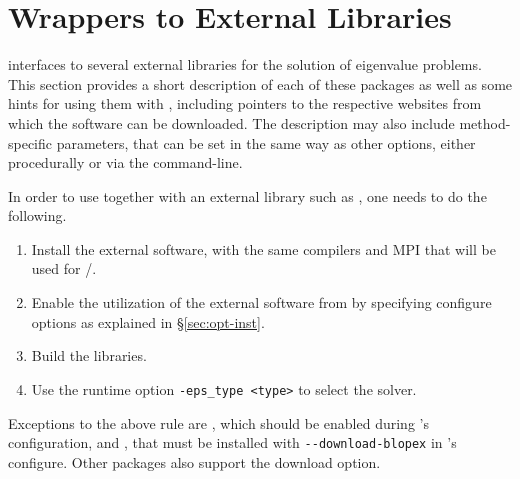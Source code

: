 \section{Wrappers to External Libraries}
\label{sec:wrap}

	\slepc interfaces to several external libraries for the solution of eigenvalue problems. This section provides a short description of each of these packages as well as some hints for using them with \slepc, including pointers to the respective websites from which the software can be downloaded. The description may also include method-specific parameters, that can be set in the same way as other \slepc options, either procedurally or via the command-line.

	In order to use \slepc together with an external library such as \arpack, one needs to do the following.
	\begin{enumerate}
	\item Install the external software, with the same compilers and MPI that will be used for \petsc/\slepc.
	\item Enable the utilization of the external software from \slepc by specifying configure options as explained in \S\ref{sec:opt-inst}.
 	\item Build the \slepc libraries.
	\item Use the runtime option \Verb!-eps_type <type>! to select the solver.
	\end{enumerate}

	Exceptions to the above rule are \lapack, which should be enabled during \petsc's configuration, and \blopex, that must be installed with \Verb!--download-blopex! in \slepc's configure. Other packages also support the download option.

